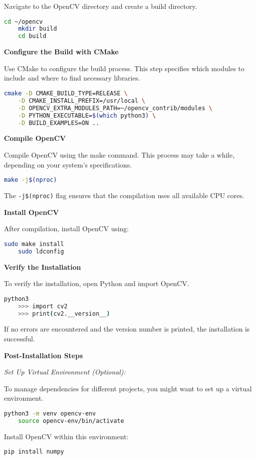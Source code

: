 Navigate to the OpenCV directory and create a build directory.
\begin{lstlisting}[language=bash]
	cd ~/opencv
	mkdir build
	cd build
\end{lstlisting}

\textbf{Configure the Build with CMake}

Use CMake to configure the build process. This step specifies which modules to include and where to find necessary libraries.
\begin{lstlisting}[language=bash]
	cmake -D CMAKE_BUILD_TYPE=RELEASE \
	-D CMAKE_INSTALL_PREFIX=/usr/local \
	-D OPENCV_EXTRA_MODULES_PATH=~/opencv_contrib/modules \
	-D PYTHON_EXECUTABLE=$(which python3) \
	-D BUILD_EXAMPLES=ON ..
\end{lstlisting}

\textbf{Compile OpenCV}

Compile OpenCV using the make command. This process may take a while, depending on your system's specifications.
\begin{lstlisting}[language=bash]
	make -j$(nproc)
\end{lstlisting}
The \texttt{-j\$(nproc)} flag ensures that the compilation uses all available CPU cores.

\textbf{Install OpenCV}

After compilation, install OpenCV using:
\begin{lstlisting}[language=bash]
	sudo make install
	sudo ldconfig
\end{lstlisting}

\textbf{Verify the Installation}

To verify the installation, open Python and import OpenCV.
\begin{lstlisting}[language=bash]
	python3
	>>> import cv2
	>>> print(cv2.__version__)
\end{lstlisting}
If no errors are encountered and the version number is printed, the installation is successful.

\textbf{Post-Installation Steps}

\textit{Set Up Virtual Environment (Optional):}

To manage dependencies for different projects, you might want to set up a virtual environment.
\begin{lstlisting}[language=bash]
	python3 -m venv opencv-env
	source opencv-env/bin/activate
\end{lstlisting}
Install OpenCV within this environment:
\begin{lstlisting}[language=bash]
	pip install numpy
\end{lstlisting}

